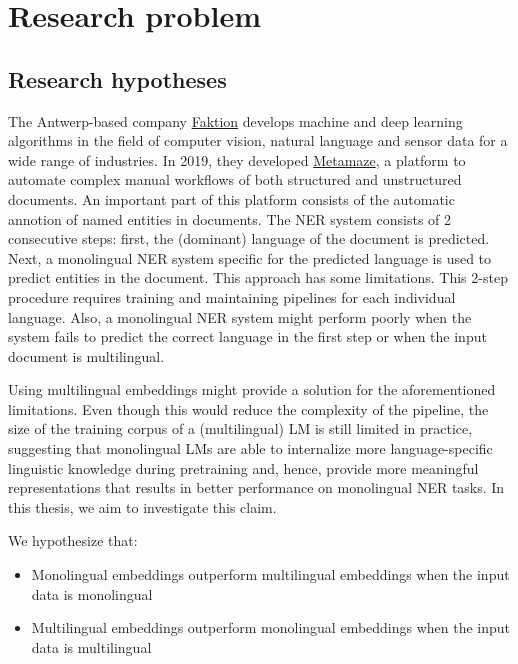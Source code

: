 \documentclass[12pt,a4paper,]{book}
\providecommand{\tightlist}{%
  \setlength{\itemsep}{0pt}\setlength{\parskip}{0pt}}
\begin{document}
\hypertarget{researchproblem}{%
\chapter{Research problem}\label{researchproblem}}

\hypertarget{research-hypotheses}{%
\section{Research hypotheses}\label{research-hypotheses}}

The Antwerp-based company \href{https://www.faktion.com/}{Faktion} develops machine and deep learning algorithms in the field of computer vision, natural language and sensor data for a wide range of industries. In 2019, they developed \href{https://metamaze.eu/}{Metamaze}, a platform to automate complex manual workflows of both structured and unstructured documents. An important part of this platform consists of the automatic annotion of named entities in documents. The NER system consists of 2 consecutive steps: first, the (dominant) language of the document is predicted. Next, a monolingual NER system specific for the predicted language is used to predict entities in the document. This approach has some limitations. This 2-step procedure requires training and maintaining pipelines for each individual language. Also, a monolingual NER system might perform poorly when the system fails to predict the correct language in the first step or when the input document is multilingual.

Using multilingual embeddings might provide a solution for the aforementioned limitations. Even though this would reduce the complexity of the pipeline, the size of the training corpus of a (multilingual) LM is still limited in practice, suggesting that monolingual LMs are able to internalize more language-specific linguistic knowledge during pretraining and, hence, provide more meaningful representations that results in better performance on monolingual NER tasks. In this thesis, we aim to investigate this claim.

We hypothesize that:

\begin{itemize}
\tightlist
\item
  Monolingual embeddings outperform multilingual embeddings when the input data is monolingual
\item
  Multilingual embeddings outperform monolingual embeddings when the input data is multilingual
\end{itemize}
\end{document}
